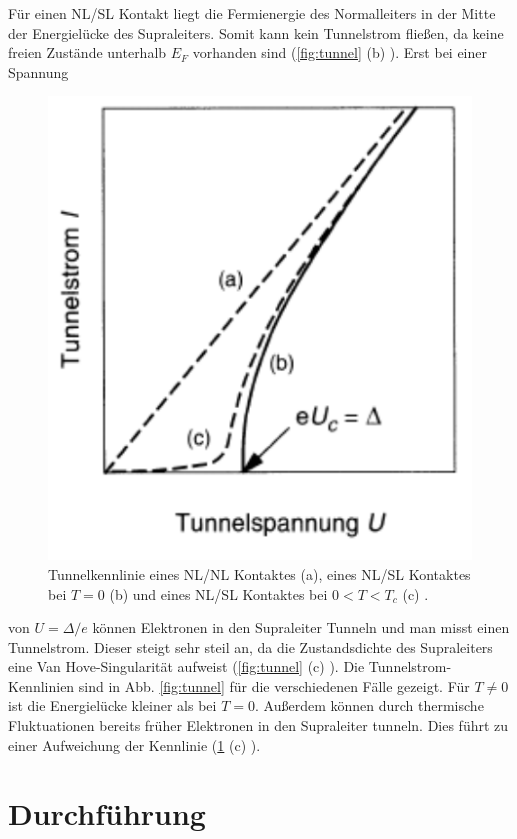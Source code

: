 \documentclass[twoside,        %
               BCOR12mm,       %
               english,ngerman, %
               fleqn,headsepline=false,footsepline=false
              ]{Vorlage/MFPREPORT}
\begin{document}
Für einen NL/SL Kontakt liegt die Fermienergie des Normalleiters in der Mitte
der Energielücke des Supraleiters. Somit kann kein Tunnelstrom fließen, da
keine freien Zustände unterhalb $E_F$ vorhanden sind (\ref{fig:tunnel} (b) ). Erst bei einer Spannung
\begin{figure}[]
    \begin{center}
        \includegraphics[scale=0.5]{fig/kennlinie.png}
    \end{center}
    \caption{Tunnelkennlinie eines NL/NL Kontaktes (a), eines NL/SL Kontaktes
    bei $T=0$ (b) und eines NL/SL Kontaktes bei $0<T<T_c$ (c) \cite[S:]{buckel2013supraleitung}.}
    \label{fig:kennlinie}
\end{figure}
von $U=\Delta/e$ können Elektronen in den Supraleiter Tunneln und man misst
einen Tunnelstrom. Dieser steigt sehr steil an, da die Zustandsdichte des
Supraleiters eine Van Hove-Singularität aufweist \cite[S]{hunklingerfk} (\ref{fig:tunnel} (c) ).
Die Tunnelstrom- Kennlinien sind in Abb. \ref{fig:tunnel} für die verschiedenen
Fälle gezeigt. Für $T\neq 0$ ist die Energielücke kleiner als bei $T=0$.
Außerdem können durch thermische Fluktuationen bereits früher Elektronen in den
Supraleiter tunneln. Dies führt zu einer Aufweichung der Kennlinie
(\ref{fig:kennlinie} (c) ).


\section{Durchführung}
\label{sec:durchfuehrung}
\end{document}
